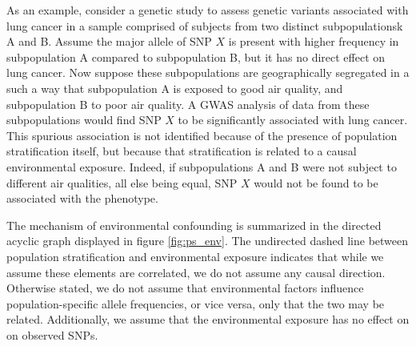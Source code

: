 As an example, consider a genetic study to assess genetic variants associated with lung cancer in a sample comprised of subjects from two distinct subpopulationsk A and B. Assume the major allele of SNP $X$ is present with higher frequency in subpopulation A compared to subpopulation B, but it has no direct effect on lung cancer. Now suppose these subpopulations are geographically segregated in a such a way that subpopulation A is exposed to good air quality, and subpopulation B to poor air quality. A GWAS analysis of data from these subpopulations would find SNP $X$ to be significantly associated with lung cancer. This spurious association is not identified because of the presence of population stratification itself, but because that stratification is related to a causal environmental exposure. Indeed, if subpopulations A and B were not subject to different air qualities, all else being equal, SNP $X$ would not be found to be associated with the phenotype.\\


The mechanism of environmental confounding is summarized in the directed acyclic graph displayed in figure \ref{fig:ps_env}. The undirected dashed line between population stratification and environmental exposure indicates that while we assume these elements are correlated, we do not assume any causal direction. Otherwise stated, we do not assume that environmental factors influence population-specific allele frequencies, or vice versa, only that the two may be related. Additionally, we assume that the environmental exposure has no effect on on observed SNPs.

\begin{figure}[H]
\centering
{}
\end{figure}


